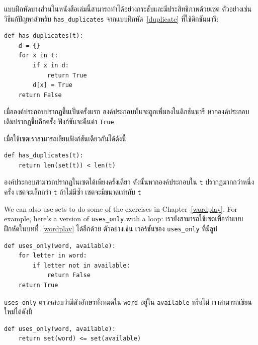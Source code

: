 แบบฝึกหัดบางส่วนในหนังสือเล่มนี้สามารถทำได้อย่างกระชับและมีประสิทธิภาพด้วยเซต ตัวอย่างเช่น วิธีแก้ปัญหาสำหรับ \verb"has_duplicates" 
จากแบบฝึกหัด~\ref{duplicate} ที่ใช้ดิกชันนารี:

\begin{verbatim}
def has_duplicates(t):
    d = {}
    for x in t:
        if x in d:
            return True
        d[x] = True
    return False
\end{verbatim}

เมื่อองค์ประกอบปรากฏขึ้นเป็นครั้งแรก องค์ประกอบนั้นจะถูกเพิ่มลงในดิกชันนารี  หากองค์ประกอบเดิมปรากฏขึ้นอีกครั้ง ฟังก์ชันจะคืนค่า {\tt True}

เมื่อใช้เซตเราสามารถเขียนฟังก์ชันเดียวกันได้ดังนี้

\begin{verbatim}
def has_duplicates(t):
    return len(set(t)) < len(t)
\end{verbatim}
%
องค์ประกอบสามารถปรากฏในเซตได้เพียงครั้งเดียว ดังนั้นหากองค์ประกอบใน {\tt t} ปรากฏมากกว่าหนึ่งครั้ง เซตจะเล็กกว่า {\tt t} ถ้าไม่มีซ้ำ เซตจะมีขนาดเท่ากับ {\tt t}

We can also use sets to do some of the exercises in
Chapter~\ref{wordplay}.  For example, here's a version of
\verb"uses_only" with a loop:
เรายังสามารถใช้เซตเพื่อทำแบบฝึกหัดในบทที่~\ref{wordplay} ได้อีกด้วย ตัวอย่างเช่น เวอร์ชันของ \verb"uses_only" ที่มีลูป

\begin{verbatim}
def uses_only(word, available):
    for letter in word: 
        if letter not in available:
            return False
    return True
\end{verbatim}
%
\verb"uses_only" ตรวจสอบว่ามีตัวอักษรทั้งหมดใน {\tt word} อยู่ใน {\tt available} หรือไม่ เราสามารถเขียนใหม่ได้ดังนี้

\begin{verbatim}
def uses_only(word, available):
    return set(word) <= set(available)
\end{verbatim}
%

